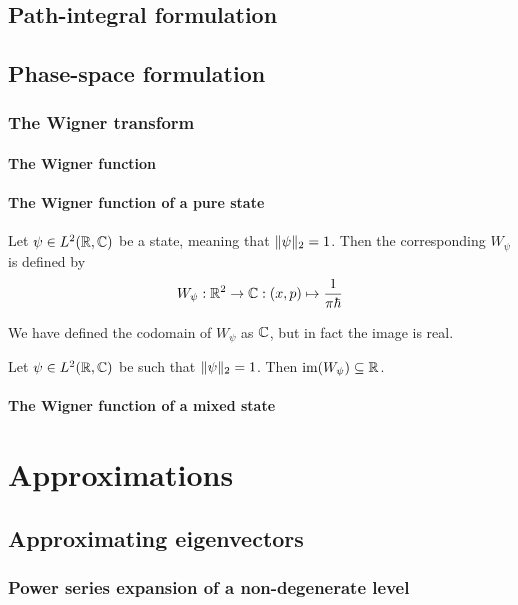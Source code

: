 \section{Path-integral formulation}
\section{Phase-space formulation}
\subsection{The Wigner transform}



\subsubsection{The Wigner function}

\subsubsection{The Wigner function of a pure state}
\begin{definition}
Let $\psi \in L^2(\mathbb{R}, \mathbb{C})$ be a state, meaning that $\lVert\psi\rVert_2 = 1$. Then the corresponding  $W_\psi$ is defined by
\[ W_\psi: \mathbb{R}^2 \to \mathbb{C}: (x,p) \mapsto \frac{1}{\pi\hbar} \]
\end{definition}
We have defined the codomain of $W_\psi$ as $\mathbb{C}$, but in fact the image is real.
\begin{lemma}
Let $\psi \in L^2(\mathbb{R}, \mathbb{C})$ be such that $\lVert\psi\rVert_2 = 1$. Then $\operatorname{im}(W_\psi) \subseteq \mathbb{R}$.
\end{lemma}

\subsubsection{The Wigner function of a mixed state}


\chapter{Approximations}
\section{Approximating eigenvectors}
\subsection{Power series expansion of a non-degenerate level}

